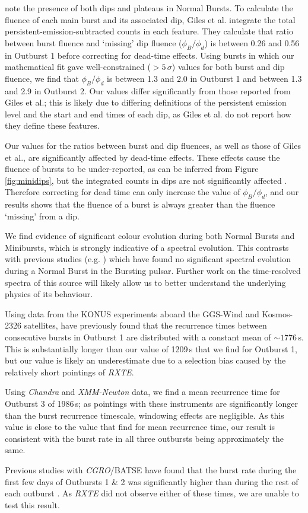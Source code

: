 \par \citet{Giles_BP} note the presence of both dips and plateaus in Normal Bursts.  To calculate the fluence of each main burst and its associated dip, Giles et al. integrate the total persistent-emission-subtracted counts in each feature.  They calculate that ratio between burst fluence and `missing' dip fluence ($\phi_{B}/\phi_{d}$) is between 0.26 and 0.56 in Outburst 1 before correcting for dead-time effects.  Using bursts in which our mathematical fit gave well-constrained ($>5\,\sigma$) values for both burst and dip fluence, we find that $\phi_{B}/\phi_{d}$ is between 1.3 and 2.0 in Outburst 1 and between 1.3 and 2.9 in Outburst 2.  Our values differ significantly from those reported from Giles et al.; this is likely due to differing definitions of the persistent emission level and the start and end times of each dip, as Giles et al. do not report how they define these features.
\par Our values for the ratios between burst and dip fluences, as well as those of Giles et al., are significantly affected by dead-time effects.  These effects cause the fluence of bursts to be under-reported, as can be inferred from Figure \ref{fig:minidips}, but the integrated counts in dips are not significantly affected \citep{Giles_BP}.  Therefore correcting for dead time can only increase the value of $\phi_{B}/\phi_{d}$, and our results shows that the fluence of a burst is always greater than the fluence `missing' from a dip.
\par We find evidence of significant colour evolution during both Normal Bursts and Minibursts, which is strongly indicative of a spectral evolution.  This contrasts with previous studies (e.g. \citealp{Woods_OB2}) which have found no significant spectral evolution during a Normal Burst in the Bursting pulsar.  Further work on the time-resolved spectra of this source will likely allow us to better understand the underlying physics of its behaviour.
\par Using data from the KONUS experiments aboard the GGS-Wind and Kosmos-2326 satellites, \citet{Aptekar_Recur} have previously found that the recurrence times between consecutive bursts in Outburst 1 are distributed with a constant mean of $\sim1776$\,s.  This is substantially longer than our value of 1209\,s that we find for Outburst 1, but our value is likely an underestimate due to a selection bias caused by the relatively short pointings of \textit{RXTE}.
\par Using \textit{Chandra} and \textit{XMM-Newton} data, we find a mean recurrence time for Outburst 3 of 1986\,s; as pointings with these instruments are significantly longer than the burst recurrence timescale, windowing effects are negligible.  As this value is close to the value that \citet{Aptekar_Recur} find for mean recurrence time, our result is consistent with the burst rate in all three outbursts being approximately the same.
\par Previous studies with \textit{CGRO}/BATSE have found that the burst rate during the first few days of Outbursts 1 \& 2 was significantly higher than during the rest of each outburst \citep{Kouveliotou_BP,Woods_OB2}.  As \textit{RXTE} did not observe either of these times, we are unable to test this result.

